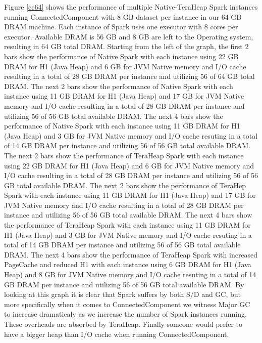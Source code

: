 Figure \ref{cc64} shows the performance of multiple Native-TeraHeap
Spark instances running ConnectedComponent with 8 GB dataset per
instance in our 64 GB DRAM machine. Each instance of Spark uses one
executor with 8 cores per executor. Available DRAM is 56 GB and 8 GB
are left to the Operating system, resulting in 64 GB total DRAM.
Starting from the left of the graph, the first 2 bars show the
performance of Native Spark with each instance using 22 GB DRAM for H1
(Java Heap) and 6 GB for JVM Native memory and I/O cache resulting in
a total of 28 GB DRAM per instance and utilizing 56 of 64 GB total
DRAM. The next 2 bars show the performance of Native Spark with each
instance using 11 GB DRAM for H1 (Java Heap) and 17 GB for JVM Native
memory and I/O cache resulting in a total of 28 GB DRAM per instance
and utilizing 56 of 56 GB total available DRAM. The next 4 bars show
the performance of Native Spark with each instance using 11 GB DRAM
for H1 (Java Heap) and 3 GB for JVM Native memory and I/O cache
resuting in a total of 14 GB DRAM per instance and utilizing 56 of 56
GB total available DRAM. The next 2 bars show the performance of
TeraHeap Spark with each instance using 22 GB DRAM for H1 (Java Heap)
and 6 GB for JVM Native memory and I/O cache resulting in a total of
28 GB DRAM per instance and utilizing 56 of 56 GB total available
DRAM. The next 2 bars show the performance of TeraHep Spark with each
instance using 11 GB DRAM for H1 (Java Heap) and 17 GB for JVM Native
memory and I/O cache resulting in a total of 28 GB DRAM per instance
and utilizing 56 of 56 GB total available DRAM. The next 4 bars show
the performance of TeraHeap Spark with each instance using 11 GB DRAM
for H1 (Java Heap) and 3 GB for JVM Native memory and I/O cache
resuting in a total of 14 GB DRAM per instance and utilizing 56 of 56
GB total available DRAM. The next 4 bars show the performance of
TeraHeap Spark with increased PageCache and reduced H1 with each
instance using 6 GB DRAM for H1 (Java Heap) and 8 GB for JVM Native
memory and I/O cache resuting in a total of 14 GB DRAM per instance
and utilizing 56 of 56 GB total available DRAM.  By looking at this
graph it is clear that Spark suffers by both S/D and GC, but more
specifically when it comes to ConnectedComponent we witness Major GC
to increase dramaticaly as we increase the number of Spark instances
running. These overheads are absorbed by TeraHeap. Finally someone
would prefer to have a bigger heap than I/O cache when running
ConnectedComponent.

